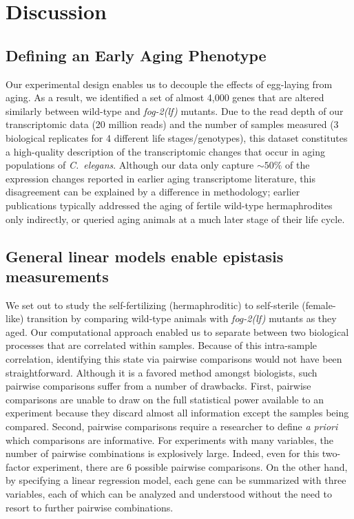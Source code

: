 \documentclass[9pt,twocolumn,twoside]{gsag3jnl}
\newcommand{\cel}{\emph{C.~elegans}}
\newcommand{\fog}{\emph{\mbox{fog-2(lf)}}}
\begin{document}
\section{Discussion}
\label{sec:discussion}

\subsection*{Defining an Early Aging Phenotype}
\label{sub:Defining an Early Aging Phenotype}

Our experimental design enables us to decouple the effects of egg-laying from
aging. As a result, we identified a set of almost 4,000 genes that are altered
similarly between wild-type and \fog{} mutants. Due to the read depth of our
transcriptomic data (20 million reads) and the number of samples measured (3
biological replicates for 4 different life stages/genotypes), this dataset
constitutes a high-quality description of the transcriptomic changes that occur
in aging populations of \cel{}. Although our data only capture $\sim50\%$ of the
expression changes reported in earlier aging transcriptome literature, this
disagreement can be explained by a difference in methodology; earlier
publications typically addressed the aging of fertile wild-type hermaphrodites
only indirectly, or queried aging animals at a much later stage of their life
cycle.


\subsection*{General linear models enable epistasis measurements}
\label{sub:lin_models}

We set out to study the self-fertilizing (hermaphroditic) to self-sterile
(female-like) transition by comparing wild-type animals with \fog{} mutants as
they aged. Our computational approach enabled us to separate between two
biological processes that are correlated within samples. Because of this
intra-sample correlation, identifying this state via pairwise comparisons would
not have been straightforward. Although it is a favored method amongst
biologists, such pairwise comparisons suffer from a number of drawbacks. First,
pairwise comparisons are unable to draw on the full statistical power available
to an experiment because they discard almost all information except the samples
being compared. Second, pairwise comparisons require a researcher to define
\emph{a priori} which comparisons are informative. For experiments with many
variables, the number of pairwise combinations is explosively large. Indeed,
even for this two-factor experiment, there are 6 possible pairwise comparisons.
On the other hand, by specifying a linear regression model, each gene can be
summarized with three variables, each of which can be analyzed and understood
without the need to resort to further pairwise combinations.
\end{document}
